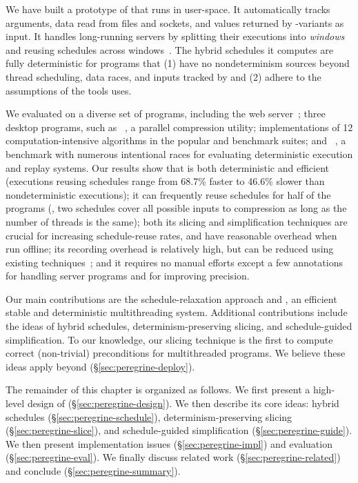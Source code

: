 We have built a prototype of \peregrine that runs in user-space.
It automatically tracks 
arguments, data read from files and sockets, and values
returned by -variants as input.  It handles long-running servers by
splitting their executions into \emph{windows} and
reusing schedules across windows~\cite{cui:tern:osdi10}.
The hybrid schedules it computes are fully deterministic for programs that
(1) have no nondeterminism sources beyond thread scheduling, data races, and
inputs tracked by \peregrine and (2) adhere to the assumptions of the tools
\peregrine uses.

We evaluated \peregrine on a diverse set of \peregrinenprog programs, including
the
\apache web server~\cite{apache}; three desktop programs, such as
\pbzip~\cite{pbzip2}, a parallel compression utility; implementations of
12 computation-intensive algorithms in the popular \splash and \parsec
benchmark suites; and \racey~\cite{racy-stress}, a benchmark with numerous
intentional races for evaluating deterministic execution and replay
systems.  Our results show that \peregrine is both deterministic and efficient
(executions reusing schedules range from 68.7\% faster to 46.6\% slower
than nondeterministic executions); it can frequently reuse schedules for
half of the programs (\eg, two schedules cover all possible inputs to
\pbzip compression as long as the number of threads is the same); both its
slicing and
simplification techniques are crucial for increasing schedule-reuse rates,
and have reasonable overhead when run offline; its recording overhead
is relatively high, but can be reduced using existing
techniques~\cite{idna:vee06}; and it requires no manual efforts except a
few annotations for handling server programs and for improving precision.

Our main contributions are the schedule-relaxation approach and \peregrine, an
 efficient stable and deterministic multithreading system.  Additional contributions include
the ideas of hybrid schedules, determinism-preserving slicing, and
schedule-guided simplification.  To our knowledge, our slicing technique
is the first to compute correct (non-trivial) preconditions for
multithreaded programs.
We believe these ideas apply beyond \peregrine (\S\ref{sec:peregrine-deploy}).

The remainder of this chapter is organized as follows.  We first present a
high-level design of \peregrine (\S\ref{sec:peregrine-design}).  We then
describe its
core ideas: hybrid schedules (\S\ref{sec:peregrine-schedule}),
determinism-preserving slicing (\S\ref{sec:peregrine-slice}), and
schedule-guided
simplification (\S\ref{sec:peregrine-guide}).  We then present implementation
issues
(\S\ref{sec:peregrine-impl}) and evaluation (\S\ref{sec:peregrine-eval}).  We
finally discuss
related work (\S\ref{sec:peregrine-related}) and conclude
(\S\ref{sec:peregrine-summary}).
